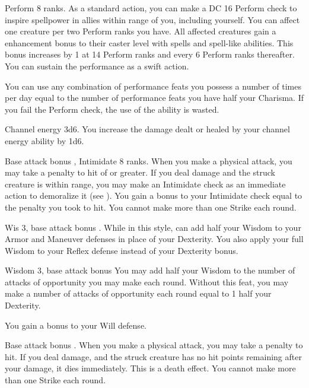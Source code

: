 \featpre Perform 8 ranks.
\featben As a standard action, you can make a DC 16 Perform check to inspire spellpower in allies within \rngmed range of you, including yourself. You can affect one creature per two Perform ranks you have. All affected creatures gain a  enhancement bonus to their caster level with spells and spell-like abilities. This bonus increases by 1 at 14 Perform ranks and every 6 Perform ranks thereafter. You can sustain the performance as a swift action.

You can use any combination of performance feats you possess a number of times per day equal to the number of performance feats you have \add half your Charisma. If you fail the Perform check, the use of the ability is wasted.

 Channel energy 3d6.
 You increase the damage dealt or healed by your channel energy ability by 1d6.

\featpres Base attack bonus , Intimidate 8 ranks.
\featben When you make a physical attack, you may take a penalty to hit of  or greater. If you deal damage and the struck creature is within \rngmed range, you may make an Intimidate check as an immediate action to demoralize it (see ). You gain a bonus to your Intimidate check equal to the penalty you took to hit. You cannot make more than one Strike each round.

\featpre Wis 3, base attack bonus .
\featben While in this style, can add half your Wisdom to your Armor and Maneuver defenses in place of your Dexterity. You also apply your full Wisdom to your Reflex defense instead of your Dexterity bonus. 

\featpres Wisdom 3, base attack bonus 
\featben You may add half your Wisdom to the number of attacks of opportunity you may make each round.
 Without this feat, you may make a number of attacks of opportunity each round equal to 1 \add half your Dexterity.

 You gain a  bonus to your Will defense.

\featpre Base attack bonus .
\featben When you make a physical attack, you may take a  penalty to hit. If you deal damage, and the struck creature has no hit points remaining after your damage, it dies immediately. This is a death effect. You cannot make more than one Strike each round.

